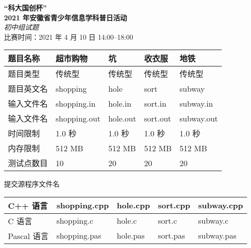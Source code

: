 \documentclass[11pt,a4paper,oneside]{article}
\begin{document}


\begin{center}
\textbf{\huge “科大国创杯” \\ 2021 年安徽省青少年信息学科普日活动}\\
  {\LARGE \textit{初中组试题}\\\vspace{1em}}
  {\Large 比赛时间：2021 年 4 月 10 日 14:00–18:00}
\end{center}

\begin{center}
\begin{tabular}{|l|l|l|l|l|}
\hline
题目名称&超市购物&坑&收衣服&地铁\\
\hline
题目类型&传统型&传统型&传统型&传统型\\
\hline
题目英文名&\ttfamily shopping&\ttfamily hole&\ttfamily sort&\ttfamily subway\\
\hline
输入文件名&\ttfamily shopping.in&\ttfamily hole.in&\ttfamily sort.in&\ttfamily subway.in\\
\hline
输入文件名&\ttfamily shopping.out&\ttfamily hole.out&\ttfamily sort.out&\ttfamily subway.out\\
\hline
时间限制&1.0 秒&1.0 秒&1.0 秒&1.0 秒\\
\hline
内存限制&512 MB&512 MB&512 MB&512 MB\\
\hline
测试点数目&10&20&20&20\\
\hline
\end{tabular}
\end{center}

提交源程序文件名

\begin{center}
\begin{tabular}{|l|l|l|l|l|}
\hline
C++ 语言 &\ttfamily shopping.cpp&\ttfamily hole.cpp&\ttfamily sort.cpp&\ttfamily subway.cpp\\
\hline
C 语言 &\ttfamily shopping.c&\ttfamily hole.c&\ttfamily sort.c&\ttfamily subway.c\\
\hline
Pascal 语言 &\ttfamily shopping.pas&\ttfamily hole.pas&\ttfamily sort.pas&\ttfamily subway.pas\\
\hline
\end{tabular}
\end{center}
\end{document}
